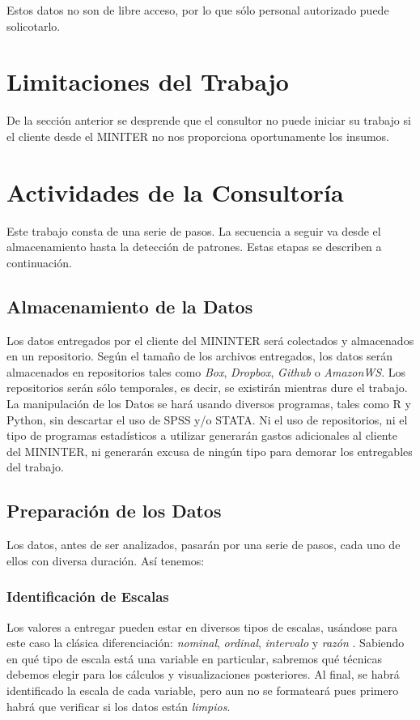 \documentclass{article}
\begin{document}
Estos datos no son de libre acceso, por lo que s\'{o}lo personal autorizado puede solicotarlo.

\section{Limitaciones del Trabajo}

De la secci\'{o}n anterior se desprende que el consultor no puede iniciar su trabajo si el cliente desde el MINITER no nos proporciona oportunamente los insumos.

\section{Actividades de la Consultor\'{i}a}

Este trabajo consta de una serie de pasos. La secuencia a seguir va desde el almacenamiento hasta la detección de patrones\cite{magallanes_reyes_introducing_2017}. Estas etapas se describen a continuación.

\subsection{Almacenamiento de la Datos}

Los datos entregados por el cliente del MININTER será colectados y almacenados en un repositorio. Según el tamaño de los archivos entregados, los datos serán almacenados en repositorios tales como \emph{Box}, \emph{Dropbox}, \emph{Github} o \emph{AmazonWS}. Los repositorios serán sólo temporales, es decir, se existirán mientras dure el trabajo. La manipulación de los Datos se hará usando diversos programas, tales como R y Python, sin descartar el uso de SPSS y/o STATA. Ni el uso de repositorios, ni el tipo de programas estadísticos a utilizar generarán gastos adicionales al cliente del MININTER, ni generarán excusa de ningún tipo para demorar los entregables del trabajo.

\subsection{Preparación de los Datos}

Los datos, antes de ser analizados, pasarán por una serie de pasos, cada uno de ellos con diversa duración. Así tenemos:

\subsubsection{Identificación de Escalas}
Los valores a entregar pueden estar en diversos tipos de escalas, usándose para este caso la clásica diferenciación: \emph{nominal}, \emph{ordinal}, \emph{intervalo} y \emph{razón} \cite{stevens_theory_1946}. Sabiendo en qué tipo de escala está una variable en particular, sabremos qué técnicas debemos elegir para los cálculos y visualizaciones posteriores. Al final, se habrá identificado la escala de cada variable, pero aun no se formateará pues primero habrá que verificar si los datos están \emph{limpios}.
\end{document}
